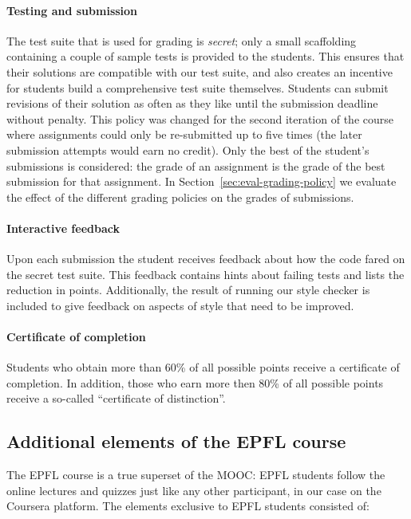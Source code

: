 \documentclass{sig-alternate}
\begin{document}
\paragraph{Testing and submission}

The test suite that is used for grading is {\em secret}; only a small
scaffolding containing a couple of sample tests is provided to the students.
This ensures that their solutions are compatible with our test suite, and
also creates an incentive for students build a comprehensive test
suite themselves. Students can submit revisions of their solution as often
as they like until the submission deadline without penalty. This policy was
changed for the second iteration of the course where assignments could only be
re-submitted up to five times (the later submission attempts would
earn no credit). Only the best of the student's submissions is considered:
the grade of an assignment is the grade of the best submission for that
assignment. In Section~\ref{sec:eval-grading-policy} we evaluate the effect
of the different grading policies on the grades of submissions.

\paragraph{Interactive feedback}

Upon each submission the student receives feedback about how the code fared on
the secret test suite. This feedback contains hints about failing tests and
lists the reduction in points. Additionally, the result of
running our style checker is included to give feedback on aspects of style
that need to be improved.


\paragraph{Certificate of completion} Students who obtain more than 60\% of
all possible points receive a certificate of completion. In addition, those
who earn more then 80\% of all possible points receive a so-called
``certificate of distinction''.

\subsection{Additional elements of the EPFL course}

The EPFL course is a true superset of the MOOC: EPFL students follow the
online lectures and quizzes just like any other participant, in our
case on the Coursera platform. The elements exclusive to EPFL students
consisted of:
\end{document}
